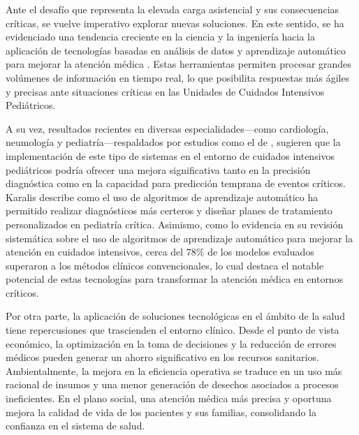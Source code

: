 Ante el desafío que representa la elevada carga asistencial y sus consecuencias críticas, se vuelve imperativo explorar nuevas soluciones. En este sentido, se ha evidenciado una tendencia creciente en la ciencia y la ingeniería hacia la aplicación de tecnologías basadas en análisis de datos y aprendizaje automático para mejorar la atención médica \parencite{Davenport2019}. Estas herramientas permiten procesar grandes volúmenes de información en tiempo real, lo que posibilita respuestas más ágiles y precisas ante situaciones críticas en las Unidades de Cuidados Intensivos Pediátricos.

A su vez, resultados recientes en diversas especialidades—como cardiología, neumología y pediatría—respaldados por estudios como el de \textcite{Karalis2024}, sugieren que la implementación de este tipo de sistemas en el entorno de cuidados intensivos pediátricos podría ofrecer una mejora significativa tanto en la precisión diagnóstica como en la capacidad para predicción temprana de eventos críticos. Karalis describe como el uso de algoritmos de aprendizaje automático ha permitido realizar diagnósticos más certeros y diseñar planes de tratamiento personalizados en pediatría crítica. Asimismo, como lo evidencia \textcite{Adegboro2022} en su revisión sistemática sobre el uso de algoritmos de aprendizaje automático para mejorar la atención en cuidados intensivos, cerca del 78\% de los modelos evaluados superaron a los métodos clínicos convencionales, lo cual destaca el notable potencial de estas tecnologías para transformar la atención médica en entornos críticos.

Por otra parte, la aplicación de soluciones tecnológicas en el ámbito de la salud tiene repercusiones que trascienden el entorno clínico. Desde el punto de vista económico, la optimización en la toma de decisiones y la reducción de errores médicos pueden generar un ahorro significativo en los recursos sanitarios. Ambientalmente, la mejora en la eficiencia operativa se traduce en un uso más racional de insumos y una menor generación de desechos asociados a procesos ineficientes. En el plano social, una atención médica más precisa y oportuna mejora la calidad de vida de los pacientes y sus familias, consolidando la confianza en el sistema de salud.

